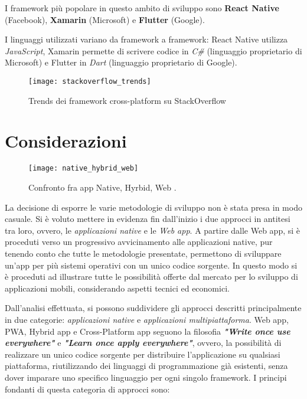 I framework più popolare in questo ambito di sviluppo sono \textbf{React Native} (Facebook), \textbf{Xamarin} (Microsoft) e \textbf{Flutter} (Google).

I linguaggi utilizzati variano da framework a framework: React Native utilizza \textit{JavaScript}, Xamarin permette di scrivere codice in \textit{C\#} (linguaggio proprietario di Microsoft) e Flutter in \textit{Dart} (linguaggio proprietario di Google).

\begin{figure}
	\begin{center}
		\texttt{[image: stackoverflow\_trends]}
		\caption[StackOverflow - Framework Cross-Paltform]{Trends dei framework cross-platform su StackOverflow \cite{stackoverflow_trends}}
		\label{figura:stackoverflow_trends}
	\end{center}
\end{figure}

\section{Considerazioni}
\begin{figure}
	\begin{center}
		\texttt{[image: native\_hybrid\_web]}
		\caption[Confronto Native, Hyrbid, Web]{Confronto fra app Native, Hyrbid, Web \cite{grafico_native_hybrid_web}.}
		\label{figura:native_hybrid_web}
	\end{center}
\end{figure}

La decisione di esporre le varie metodologie di sviluppo non è stata presa in modo casuale. Si è voluto mettere in evidenza fin dall'inizio i due approcci in antitesi tra loro, ovvero, le \textit{applicazioni native} e le \textit{Web app}. A partire dalle Web app, si è proceduti verso un progressivo avvicinamento alle applicazioni native, pur tenendo conto che tutte le metodologie presentate, permettono di sviluppare un'app per più sistemi operativi con un unico codice sorgente. In questo modo si è proceduti ad illustrare tutte le possibilità offerte dal mercato per lo sviluppo di applicazioni mobili, considerando aspetti tecnici ed economici.

Dall'analisi effettuata, si possono suddividere gli approcci descritti principalmente in due categorie: \textit{applicazioni native} e \textit{applicazioni multipiattaforma}. Web app, PWA, Hybrid app e Cross-Platform app seguono la filosofia \textbf{\textit{"Write once use everywhere"}} e \textbf{\textit{"Learn once apply everywhere"}}, ovvero, la possibilità di realizzare un unico codice sorgente per distribuire l'applicazione su qualsiasi piattaforma, riutilizzando dei linguaggi di programmazione già esistenti, senza dover imparare uno specifico linguaggio per ogni singolo framework. I principi fondanti di questa categoria di approcci sono:

